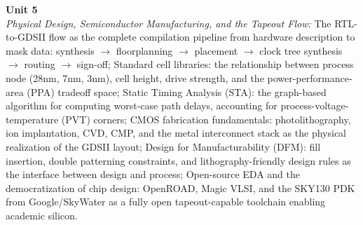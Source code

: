 \noindent\textbf{Unit 5} \\
\textit{Physical Design, Semiconductor Manufacturing, and the Tapeout Flow:} The RTL-to-GDSII flow as the complete compilation pipeline from hardware description to mask data: synthesis $\rightarrow$ floorplanning $\rightarrow$ placement $\rightarrow$ clock tree synthesis $\rightarrow$ routing $\rightarrow$ sign-off; Standard cell libraries: the relationship between process node (28nm, 7nm, 3nm), cell height, drive strength, and the power-performance-area (PPA) tradeoff space; Static Timing Analysis (STA): the graph-based algorithm for computing worst-case path delays, accounting for process-voltage-temperature (PVT) corners; CMOS fabrication fundamentals: photolithography, ion implantation, CVD, CMP, and the metal interconnect stack as the physical realization of the GDSII layout; Design for Manufacturability (DFM): fill insertion, double patterning constraints, and lithography-friendly design rules as the interface between design and process; Open-source EDA and the democratization of chip design: OpenROAD, Magic VLSI, and the SKY130 PDK from Google/SkyWater as a fully open tapeout-capable toolchain enabling academic silicon.

\newpage
{}